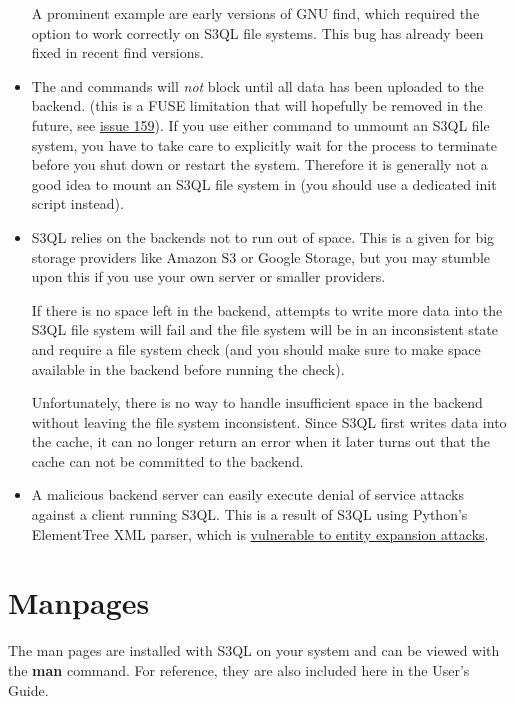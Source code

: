 \documentclass[letterpaper,10pt,english]{sphinxmanual}
\begin{document}
\begin{itemize}
A prominent example are early versions of GNU find, which required
the  option to work correctly on S3QL file systems. This
bug has already been fixed in recent find versions.

\item {} 
The  and  commands will \emph{not} block until all
data has been uploaded to the backend. (this is a FUSE limitation
that will hopefully be removed in the future, see \href{http://code.google.com/p/s3ql/issues/detail?id=159}{issue 159}). If you use
either command to unmount an S3QL file system, you have to take care
to explicitly wait for the  process to terminate before
you shut down or restart the system. Therefore it is generally not a
good idea to mount an S3QL file system in  (you should
use a dedicated init script instead).

\item {} 
S3QL relies on the backends not to run out of space. This is a given
for big storage providers like Amazon S3 or Google Storage, but you
may stumble upon this if you use your own server or smaller providers.

If there is no space left in the backend, attempts to write more
data into the S3QL file system will fail and the file system will be
in an inconsistent state and require a file system check (and you
should make sure to make space available in the backend before
running the check).

Unfortunately, there is no way to handle insufficient space in the
backend without leaving the file system inconsistent. Since
S3QL first writes data into the cache, it can no longer return an
error when it later turns out that the cache can not be committed to
the backend.

\item {} 
A malicious backend server can easily execute denial of service
attacks against a client running S3QL. This is a result of S3QL
using Python's ElementTree XML parser, which is \href{http://docs.python.org/3/library/xml.html\#xml-vulnerabilities}{vulnerable to
entity expansion attacks}.

\end{itemize}


\chapter{Manpages}
\label{man/index:manpages}\label{man/index::doc}
The man pages are installed with S3QL on your system and can be viewed
with the \textbf{man} command. For reference, they are also included
here in the User's Guide.
\end{document}
